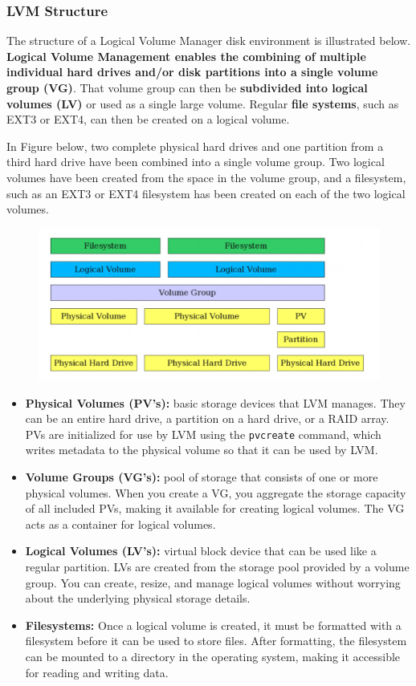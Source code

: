 \documentclass{article}
\begin{document}
\subsubsection{LVM Structure}
The structure of a Logical Volume Manager disk environment is illustrated below. \textbf{Logical Volume Management enables the combining of multiple individual hard drives and/or disk partitions into a single volume group (VG)}. That volume group can then be \textbf{subdivided into logical volumes (LV)} or used as a single large volume. Regular \textbf{file systems}, such as EXT3 or EXT4, can then be created on a logical volume.

In Figure below, two complete physical hard drives and one partition from a third hard drive have been combined into a single volume group. Two logical volumes have been created from the space in the volume group, and a filesystem, such as an EXT3 or EXT4 filesystem has been created on each of the two logical volumes.

\begin{figure}[H]
    \includegraphics[width=\textwidth]{pictures/pvs.png}
    \centering
\end{figure}

\begin{itemize}
    \item \textbf{Physical Volumes (PV's):} basic storage devices that LVM manages. They can be an entire hard drive, a partition on a hard drive, or a RAID array. PVs are initialized for use by LVM using the \verb|pvcreate| command, which writes metadata to the physical volume so that it can be used by LVM.
    \item \textbf{Volume Groups (VG's):} pool of storage that consists of one or more physical volumes. When you create a VG, you aggregate the storage capacity of all included PVs, making it available for creating logical volumes. The VG acts as a container for logical volumes.
    \item \textbf{Logical Volumes (LV's):} virtual block device that can be used like a regular partition. LVs are created from the storage pool provided by a volume group. You can create, resize, and manage logical volumes without worrying about the underlying physical storage details.
    \item \textbf{Filesystems:} Once a logical volume is created, it must be formatted with a filesystem before it can be used to store files. After formatting, the filesystem can be mounted to a directory in the operating system, making it accessible for reading and writing data.
\end{itemize}
\end{document}
